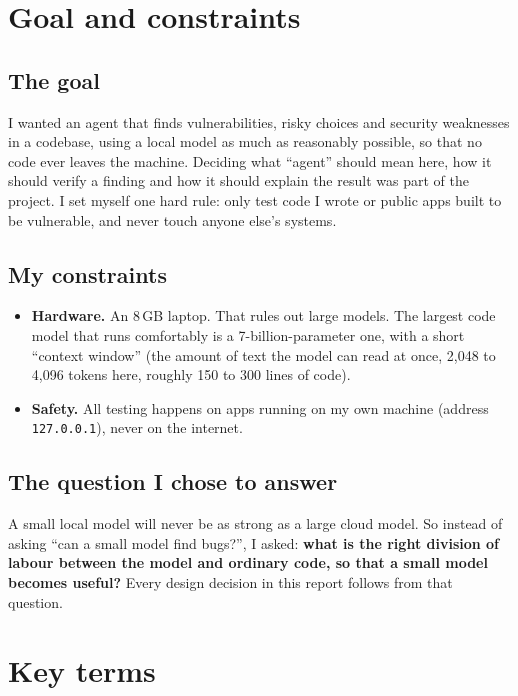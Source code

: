 \documentclass[11pt,a4paper]{article}
\newcommand{\code}[1]{\texttt{#1}}
\begin{document}
\section{Goal and constraints}

\subsection{The goal}
I wanted an agent that finds vulnerabilities, risky choices and security weaknesses in a codebase, using a
local model as much as reasonably possible, so that no code ever leaves the machine. Deciding what
``agent'' should mean here, how it should verify a finding and how it should explain the result was part of
the project. I set myself one hard rule: only test code I wrote or public apps built to be vulnerable,
and never touch anyone else's systems.

\subsection{My constraints}
\begin{itemize}
  \item \textbf{Hardware.} An 8\,GB laptop. That rules out large models. The largest code model that runs
        comfortably is a 7-billion-parameter one, with a short ``context window'' (the amount of text the
        model can read at once, 2{,}048 to 4{,}096 tokens here, roughly 150 to 300 lines of code).
  \item \textbf{Safety.} All testing happens on apps running on my own machine (address \code{127.0.0.1}),
        never on the internet.
\end{itemize}

\subsection{The question I chose to answer}
A small local model will never be as strong as a large cloud model. So instead of asking ``can a small
model find bugs?'', I asked: \textbf{what is the right division of labour between the model and ordinary
code, so that a small model becomes useful?} Every design decision in this report follows from that
question.

\section{Key terms}
\end{document}
